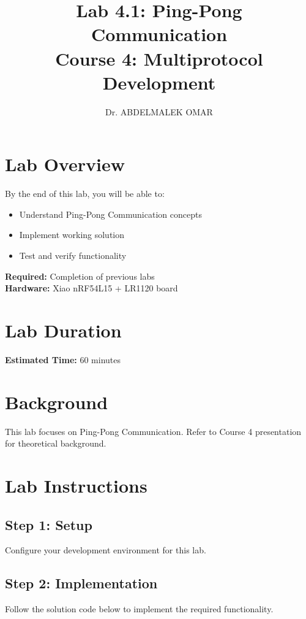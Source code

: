 \documentclass[11pt,a4paper]{article}
\title{\textbf{Lab 4.1: Ping-Pong Communication}\\
\large Course 4: Multiprotocol Development}
\author{Dr. ABDELMALEK OMAR}
\date{}
\begin{document}
\maketitle
\thispagestyle{fancy}

\section{Lab Overview}

\begin{objectivebox}
By the end of this lab, you will be able to:
\begin{itemize}
    \item Understand Ping-Pong Communication concepts
    \item Implement working solution
    \item Test and verify functionality
\end{itemize}
\end{objectivebox}

\begin{prereqbox}
\textbf{Required:} Completion of previous labs\\
\textbf{Hardware:} Xiao nRF54L15 + LR1120 board
\end{prereqbox}

\section{Lab Duration}
\textbf{Estimated Time:} 60 minutes

\section{Background}

This lab focuses on Ping-Pong Communication. Refer to Course 4 presentation for theoretical background.

\section{Lab Instructions}

\subsection{Step 1: Setup}
Configure your development environment for this lab.

\subsection{Step 2: Implementation}
Follow the solution code below to implement the required functionality.
\end{document}
